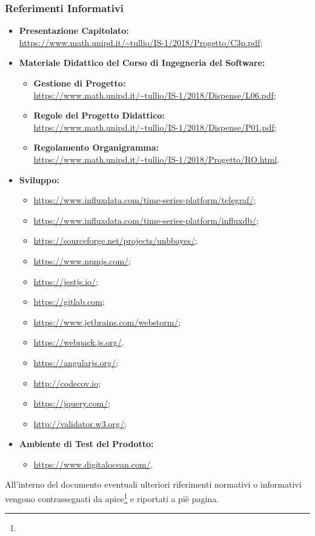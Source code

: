 \subsubsection{Referimenti Informativi}
\begin{itemize}
\item \textbf{Presentazione Capitolato:}\\ \url{https://www.math.unipd.it/~tullio/IS-1/2018/Progetto/C3p.pdf};
\item \textbf{Materiale Didattico del Corso di Ingegneria del Software:}
	\begin{itemize}
	\item \textbf{Gestione di Progetto:}\\ \url{https://www.math.unipd.it/~tullio/IS-1/2018/Dispense/L06.pdf};
	\item \textbf{Regole del Progetto Didattico:}\\ \url{https://www.math.unipd.it/~tullio/IS-1/2018/Dispense/P01.pdf};
	\item \textbf{Regolamento Organigramma:}\\ \url{https://www.math.unipd.it/~tullio/IS-1/2018/Progetto/RO.html}.
	\end{itemize}
\item \textbf{Sviluppo:}
	\begin{itemize}
	\item \url{https://www.influxdata.com/time-series-platform/telegraf/};
	\item \url{https://www.influxdata.com/time-series-platform/influxdb/};
	\item \url{https://sourceforge.net/projects/unbbayes/};
	\item \url{https://www.npmjs.com/};
	\item \url{https://jestjs.io/};
	\item \url{https://gitlab.com};
	\item \url{https://www.jetbrains.com/webstorm/};
	\item \url{https://webpack.js.org/}.
	\item \url{https://angularjs.org/};
	\item \url{http://codecov.io};
	\item \url{https://jquery.com/};
	\item \url{http://validator.w3.org/};
	
	\end{itemize}
\item \textbf{Ambiente di Test del Prodotto:}
\begin{itemize}
	\item \url{https://www.digitalocean.com/}.
\end{itemize}
\end{itemize}

All'interno del documento eventuali ulteriori riferimenti normativi o informativi vengono contrassegnati da apice\footnote{} e riportati a piè pagina.